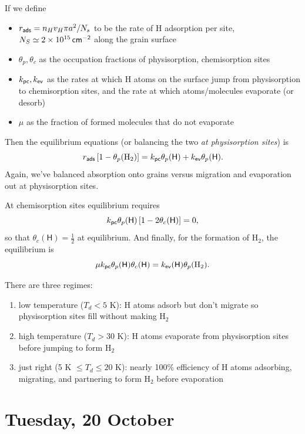 \documentclass{tufte-handout}
\renewcommand{\rm}{\sf}
\renewcommand{\textrm}{\textsf}
\newcommand{\Htwo}{\textnormal{H$_2$}}
\newcommand{\e}[1]{\times 10^{#1}}
\begin{document}
If we define
\begin{itemize}
\item $r_{\rm ads}= n_Hv_H \pi a^2 / N_s$ to be the rate of H adsorption per site, $N_S \simeq 2\e{15}\,{\rm cm^{-2}}$ along the grain surface
\item $\theta_p, \theta_c$ as the occupation fractions of physisorption, chemisorption sites
\item $k_{\rm pc}, k_{\rm ev}$ as the rates at which H atoms on the surface jump from physisorption to chemisorption sites, and the rate at which atoms/molecules evaporate (or desorb)
\item $\mu$ as the fraction of formed molecules that do not evaporate
\end{itemize}

Then the equilibrium equations (or balancing the two \textit{at physisorption sites}) is
\begin{equation}
r_{\rm ads}\left [1 - \theta_p(\textrm{\Htwo})\right ] = k_{\rm pc}\theta_p(\textrm{H}) + k_{\rm ev} \theta_p(\textrm{H}).
\end{equation}
Again, we've balanced absorption onto grains versus migration and evaporation out at physisorption sites.

At chemisorption sites equilibrium requires
\begin{equation}
k_{\rm pc}\theta_p(\textrm{H}) \left [1 - 2\theta_c(\textrm{H}) \right ] = 0,
\end{equation}
so that $\theta_c(\textrm{H}) = \frac{1}{2}$ at equilibrium. And finally, for the formation of \Htwo{}, the equilibrium is
\begin{equation}
\mu k_{\rm pc} \theta_p(\textrm{H}) \theta_c(\textrm{H}) = k_{\rm ev} (\textrm{H}) \theta_p(\textrm{\Htwo}).
\end{equation}

There are three regimes:
\begin{enumerate}
\item low temperature ($T_d < 5$ K): H atoms adsorb but don't migrate so physisorption sites fill without making \Htwo{}
\item high temperature ($T_d > 30$ K): H atoms evaporate from physisorption sites before jumping to form \Htwo{}
\item just right (5 K $\leq T_d \leq 20$ K): nearly 100\% efficiency of H atoms adsorbing, migrating, and partnering to form \Htwo{} before evaporation
\end{enumerate}

\section{Tuesday, 20 October}
\end{document}
